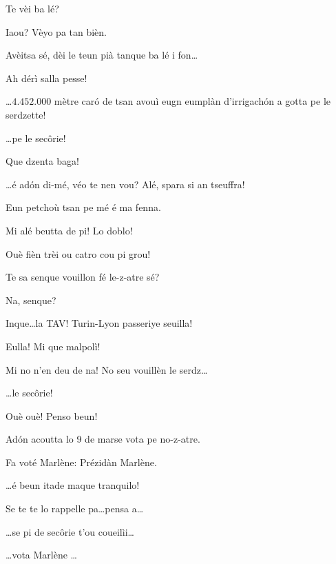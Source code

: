 \begin{drama}
\Dallasspeaks{} Te vèi ba lé?


\Pompiolenspeaks {} Iaou? Vèyo pa tan bièn.

\Dallasspeaks Avèitsa sé, dèi le teun pià tanque ba lé i fon\ldots

\Pompiolenspeaks Ah dérì salla pesse!

\Dallasspeaks \ldots $4.452.000$ mètre car\'o de tsan avouì eugn eumplàn d'irrigach\'on a gotta pe le serdzette!

\Joellespeaks \ldots pe le sec\^orie! 

\Pompiolenspeaks Que dzenta baga!

\Dallasspeaks \ldots é ad\'on di-mé, véo te nen vou? Alé, spara si an tseuffra!

\Pompiolenspeaks Eun petchoù tsan pe mé é ma fenna.

\Dallasspeaks Mi alé beutta de pi! Lo doblo!

\Joellespeaks Ouè fièn trèi ou catro cou pi grou!

\Dallasspeaks {} Te sa senque vouillon fé le-z-atre sé?

\Pompiolenspeaks Na, senque?

\Dallasspeaks Inque\ldots la TAV! Turin-Lyon passeriye seuilla!

\Pompiolenspeaks {} Eulla! Mi que malpolì!

\Dallasspeaks Mi no n'en deu de na! No seu vouillèn le serdz\ldots


\Dallasspeaks \ldots le sec\^orie!

\Pompiolenspeaks Ouè ouè! Penso beun!

\Dallasspeaks Ad\'on acoutta  lo 9 de marse vota pe no-z-atre.

\Joellespeaks Fa voté Marlène: Prézidàn Marlène.

\Pompiolenspeaks \ldots é beun itade maque tranquilo!

\Dallasspeaks Se te te lo rappelle pa\ldots pensa a\ldots

\Joellespeaks \ldots se pi de sec\^orie t'ou coueilìi\ldots

\Dallasspeaks \ldots vota Marlène \ldots


\end{drama}
